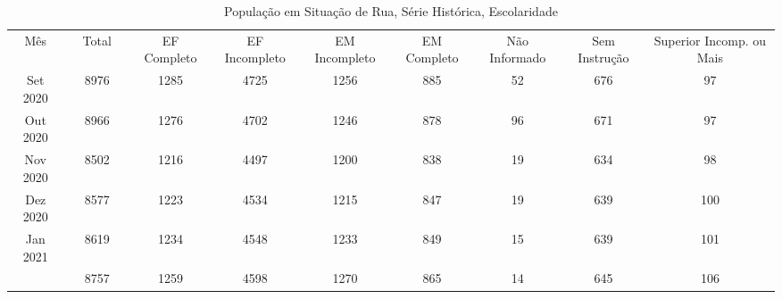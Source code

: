 \documentclass[12pt]{article}
\begin{document}
\begin{landscape}
\pagestyle{empty}
\begin{table}[htbp]
  \centering
  \caption{População em Situação de Rua, Série Histórica, Escolaridade}
  	\tabcolsep=0.15cm
	\renewcommand{\arraystretch}{1.3}
	\begin{adjustbox}{max width=\linewidth}
    \begin{tabular}{lllllllllll}
\cmidrule{1-3}\cmidrule{5-11}    \multicolumn{1}{c}{Mês} &      & \multicolumn{1}{c}{Total} &      & \multicolumn{1}{c}{EF Completo} & \multicolumn{1}{c}{EF Incompleto} & \multicolumn{1}{c}{EM Incompleto} & \multicolumn{1}{c}{EM Completo} & \multicolumn{1}{c}{Não Informado} & \multicolumn{1}{c}{Sem Instrução} & \multicolumn{1}{c}{Superior Incomp. ou Mais} \\
\cmidrule{1-3}\cmidrule{5-11}    \multicolumn{1}{c}{Set 2020} &      & \multicolumn{1}{c}{8976} &      & \multicolumn{1}{c}{1285} & \multicolumn{1}{c}{4725} & \multicolumn{1}{c}{1256} & \multicolumn{1}{c}{885} & \multicolumn{1}{c}{52} & \multicolumn{1}{c}{676} & \multicolumn{1}{c}{97} \\
    \multicolumn{1}{c}{Out 2020} &      & \multicolumn{1}{c}{8966} &      & \multicolumn{1}{c}{1276} & \multicolumn{1}{c}{4702} & \multicolumn{1}{c}{1246} & \multicolumn{1}{c}{878} & \multicolumn{1}{c}{96} & \multicolumn{1}{c}{671} & \multicolumn{1}{c}{97} \\
    \multicolumn{1}{c}{Nov 2020} &      & \multicolumn{1}{c}{8502} &      & \multicolumn{1}{c}{1216} & \multicolumn{1}{c}{4497} & \multicolumn{1}{c}{1200} & \multicolumn{1}{c}{838} & \multicolumn{1}{c}{19} & \multicolumn{1}{c}{634} & \multicolumn{1}{c}{98} \\
    \multicolumn{1}{c}{Dez 2020} &      & \multicolumn{1}{c}{8577} &      & \multicolumn{1}{c}{1223} & \multicolumn{1}{c}{4534} & \multicolumn{1}{c}{1215} & \multicolumn{1}{c}{847} & \multicolumn{1}{c}{19} & \multicolumn{1}{c}{639} & \multicolumn{1}{c}{100} \\
    \multicolumn{1}{c}{Jan 2021} &      & \multicolumn{1}{c}{8619} &      & \multicolumn{1}{c}{1234} & \multicolumn{1}{c}{4548} & \multicolumn{1}{c}{1233} & \multicolumn{1}{c}{849} & \multicolumn{1}{c}{15} & \multicolumn{1}{c}{639} & \multicolumn{1}{c}{101} \\
    \rowcolor[rgb]{ .851,  .851,  .851} \multicolumn{1}{c}{Fev 2021} &      & \multicolumn{1}{c}{8757} &      & \multicolumn{1}{c}{1259} & \multicolumn{1}{c}{4598} & \multicolumn{1}{c}{1270} & \multicolumn{1}{c}{865} & \multicolumn{1}{c}{14} & \multicolumn{1}{c}{645} & \multicolumn{1}{c}{106} \\

\end{tabular}
\end{adjustbox}
\end{table}
\end{landscape}
\end{document}
